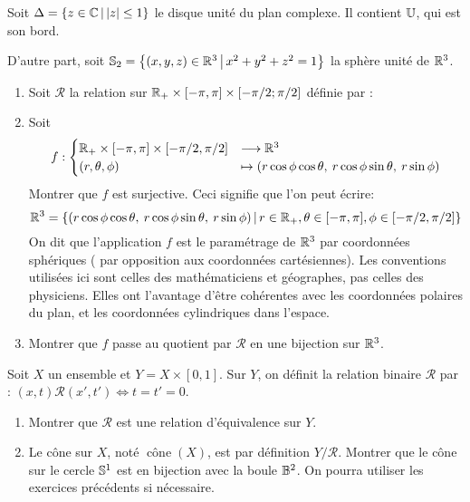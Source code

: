 \begin{exercice}
Soit $\Delta=\ensemble{z\in \C}{|z|\leq 1}$ le disque unité du plan complexe. Il contient $\U$, qui est son bord. 

D'autre part, soit $\S_2=\ensemble{(x,y,z)\in\R^3}{x^2+y^2+z^2=1}$ la sphère unité de $\R^3$.
\end{exercice}


\begin{exercice}
\begin{enumerate}
\item Soit $\mathcal R$ la relation sur $\R_+ \times [-\pi,\pi] \times [-\pi/2;\pi/2] $ définie par :
\[\]


\item Soit 
\[ f : 
\begin{cases}
\R_+ \times [-\pi,\pi] \times [-\pi/2,\pi/2] &\longrightarrow \R^3\\
(r,\theta,\phi) &\mapsto (r\cos\phi\cos\theta,\: r\cos\phi\sin\theta, \: r\sin\phi)
\end{cases}
\]
Montrer que $f$ est surjective. Ceci signifie que l'on peut écrire:
\[ \R^3 = \ensemble{(r\cos\phi\cos\theta,\: r\cos\phi\sin\theta, \: r\sin\phi)}{r\in \R_+, \theta\in [-\pi,\pi], \phi\in [-\pi/2,\pi/2]}
\]
On dit que l'application $f$ est le paramétrage de $\R^3$ par coordonnées sphériques ( par opposition aux coordonnées cartésiennes). Les conventions utilisées ici sont celles des mathématiciens et géographes, pas celles des physiciens. Elles ont l'avantage d'être cohérentes avec les coordonnées polaires du plan, et les coordonnées cylindriques dans l'espace.
\item Montrer que $f$ passe au quotient par $\mathcal R$ en une bijection sur $\R^3$.
\end{enumerate}
\end{exercice}


\begin{exercice}
Soit $X$ un ensemble et $Y = X\times [0,1]$. Sur $Y$, on définit la relation binaire $\mathcal R$ par : $(x,t)\mathcal R (x',t') \iff t=t'=0$.
\begin{enumerate}
\item Montrer que $\mathcal R$ est une relation d'équivalence sur $Y$.
\item Le cône sur $X$, noté $\operatorname{cône}(X)$, est par définition $Y/\mathcal R$. Montrer que le cône sur le cercle $\S^1$ est en bijection avec la boule  $\B^{2}$. On pourra utiliser les exercices précédents si nécessaire.
\end{enumerate}
\end{exercice}

